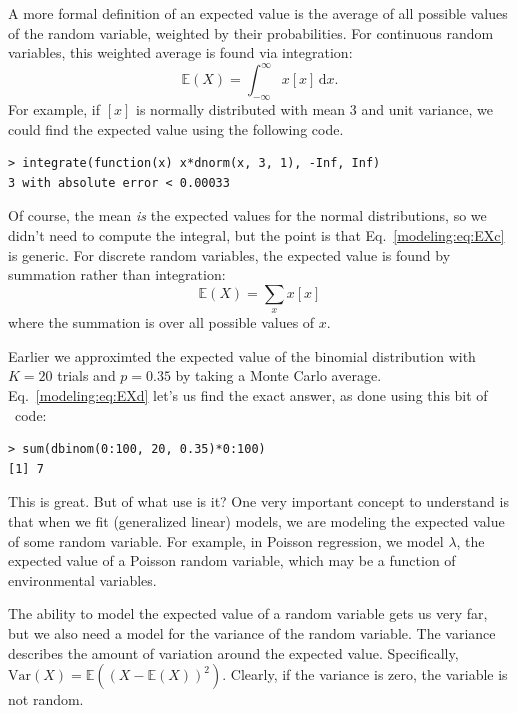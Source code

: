 A more formal definition of an expected value is the average of all
possible values of the random variable, weighted by their
probabilities. For continuous random variables, this weighted average
is found via integration:
\begin{equation}
  \mathbb{E}(X) = \int_{-\infty}^{\infty} x[x] \, \text{d}{x}.
  \label{modeling:eq:EXc}
\end{equation}
For example, if $[x]$ is normally distributed with mean 3 and unit
variance, we could find the expected value using the following code.
\begin{verbatim}
> integrate(function(x) x*dnorm(x, 3, 1), -Inf, Inf)
3 with absolute error < 0.00033
\end{verbatim}
Of course, the mean \textit{is} the expected values for the normal
distributions, so we didn't need to compute the integral, but the
point is that Eq.~\ref{modeling:eq:EXc} is generic. For discrete
random variables, the expected value is found by summation rather than
integration:
\begin{equation}
  \mathbb{E}(X) = \sum_{x} x[x]
  \label{modeling:eq:EXd}
\end{equation}
where the summation is over all possible values of $x$.

Earlier we
approximted the expected value of the binomial distribution
with $K=20$ trials and $p=0.35$ by taking a Monte Carlo
average. Eq.~\ref{modeling:eq:EXd} let's us
find the exact answer, as done using this bit of \R~code:
\begin{verbatim}
> sum(dbinom(0:100, 20, 0.35)*0:100)
[1] 7
\end{verbatim}
This is great. But of what use is it? One very
important concept to understand is that when we fit (generalized
linear) models, we are modeling the expected value of some random
variable. For example, in Poisson regression, we model $\lambda$, the
expected value of a Poisson random variable, which may be a function
of environmental variables.

The ability to model the expected value of a random variable gets us
very far, but we also need a model for the variance of the random
variable. The variance %
describes the amount of variation around the expected
value. Specifically, $\text{Var}(X) = \mathbb{E}((X -
\mathbb{E}(X))^2)$. Clearly, if the variance is zero, the variable is
not random.

